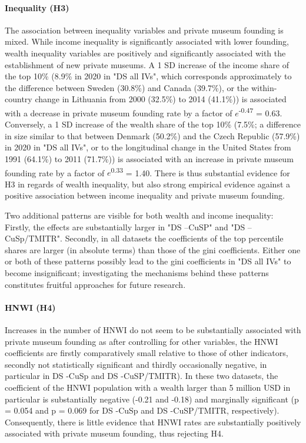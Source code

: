 \documentclass[11pt]{article}
\begin{document}
\paragraph*{Inequality (H3)}



The association between inequality variables and private museum founding is mixed.
While income inequality is significantly associated with lower founding, wealth inequality variables are positively and significantly associated with the establishment of new private museums. 
A 1 SD increase of the income share of the top 10\% (8.9\% in 2020 in "DS all IVs", which corresponds approximately to the difference between Sweden (30.8\%) and Canada (39.7\%), or the within-country change in Lithuania from 2000 (32.5\%) to 2014 (41.1\%)) is associated with a decrease in private museum founding rate by a factor of \(e\)\textsuperscript{-0.47} = 0.63. 
Conversely, a 1 SD increase of the wealth share of the top 10\% (7.5\%; a difference in size similar to that between Denmark (50.2\%) and the Czech Republic (57.9\%) in 2020 in "DS all IVs", or to the longitudinal change in the United States from 1991 (64.1\%) to 2011 (71.7\%)) is associated with an increase in private museum founding rate by a factor of \(e\)\textsuperscript{0.33} = 1.40.
There is thus substantial evidence for H3 in regards of wealth inequality, but also strong empirical evidence against a positive association between income inequality and private museum founding. 


Two additional patterns are visible for both wealth and income inequality: 
Firstly, the effects are substantially larger in "DS --CuSP" and "DS --CuSp/TMITR".
Secondly, in all datasets the coefficients of the top percentile shares are larger (in absolute terms) than those of the gini coefficients.
Either one or both of these patterns possibly lead to the gini coefficients in "DS all IVs" to become insignificant; investigating the mechanisms behind these patterns constitutes fruitful approaches for future research. 



\paragraph*{HNWI (H4)}


Increases in the number of HNWI do not seem to be substantially associated with private museum founding as after controlling for other variables, the HNWI coefficients are firstly comparatively small relative to those of other indicators, secondly not statistically significant and thirdly occasionally negative, in particular in DS -CuSp and DS -CuSP/TMITR).
In these two datasets, the coefficient of the HNWI population with a wealth larger than 5 million USD in particular is substantially negative (-0.21 and -0.18) and marginally significant (p = 0.054 and p = 0.069 for DS -CuSp and DS -CuSP/TMITR, respectively).
Consequently, there is little evidence that HNWI rates are substantially positively associated with private museum founding, thus rejecting H4.
\end{document}
